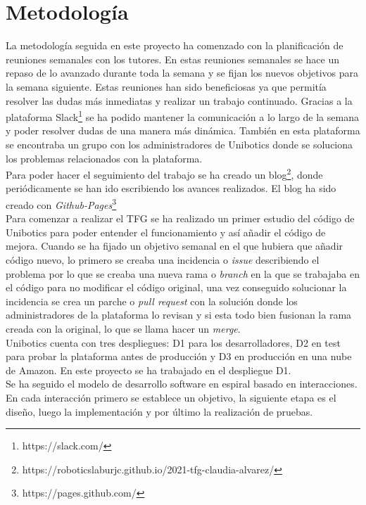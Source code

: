 \section{Metodología}

La metodología seguida en este proyecto ha comenzado con la planificación de reuniones semanales con los tutores. En estas reuniones semanales se hace un repaso de lo avanzado durante toda la semana y se fijan los nuevos objetivos para la semana siguiente. Estas reuniones han sido beneficiosas ya que permitía resolver las dudas más inmediatas y realizar un trabajo continuado. Gracias a la plataforma Slack\footnote{https://slack.com/} se ha podido mantener la comunicación a lo largo de la semana y poder resolver dudas de una manera más dinámica. También en esta plataforma se encontraba un grupo con los administradores de Unibotics donde se soluciona los problemas relacionados con la plataforma.\\

Para poder hacer el seguimiento del trabajo se ha creado un blog\footnote{https://roboticslaburjc.github.io/2021-tfg-claudia-alvarez/}, donde periódicamente se han ido escribiendo los avances realizados. El blog ha sido creado con \textit{Github-Pages}\footnote{https://pages.github.com/}\\

Para comenzar a realizar el TFG se ha realizado un primer estudio del código de Unibotics para poder entender el funcionamiento y así añadir el código de mejora. Cuando se ha fijado un objetivo semanal en el que hubiera que añadir código nuevo, lo primero se creaba una incidencia o \textit{issue} describiendo el problema por lo que se creaba una nueva rama o \textit{branch} en la que se trabajaba en el código para no modificar el código original, una vez conseguido solucionar la incidencia se crea un parche o \textit{pull request} con la solución donde los administradores de la plataforma lo revisan y si esta todo bien fusionan la rama creada con la original, lo que se llama hacer un \textit{merge}.\\

Unibotics cuenta con tres despliegues: D1 para los desarrolladores, D2 en test para probar la plataforma antes de producción y D3 en producción en una nube de Amazon. En este proyecto se ha trabajado en el despliegue D1.\\

Se ha seguido el modelo de desarrollo software en espiral basado en interacciones. En cada interacción primero se establece un objetivo, la siguiente etapa es el diseño, luego la implementación y por último la realización de pruebas.


